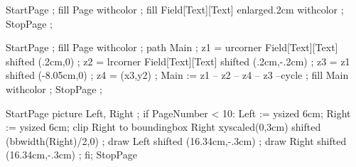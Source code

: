 \setuplayout [width=fit,
              margin=2cm,
              height=fit,
	      leftmargindistance=.8cm,
	      rightmargindistance=0cm,
              header=18mm, 
              footer=0cm, 
              topspace=.8cm, 
              backspace=2cm,
              location=singlesided]








\beginOLDTEX
{} 


StartPage ;
fill Page withcolor  ;
fill Field[Text][Text] enlarged.2cm withcolor  ;
StopPage ;
\stopuniqueMPgraphic 

StartPage ;
fill Page withcolor  ;
path Main ;
z1 = urcorner Field[Text][Text] shifted (.2cm,0) ;
z2 = lrcorner Field[Text][Text] shifted (.2cm,-.2cm) ;
z3 = z1 shifted (-8.05cm,0) ;
z4 = (x3,y2) ;
Main := z1 -- z2 -- z4 -- z3 --cycle ;
fill Main withcolor  ;
StopPage ;
\stopuniqueMPgraphic

StartPage
picture Left, Right ;
if PageNumber < 10:
	Left := \sometxt{\framed[width=1cm,offset=0pt,align=middle,frame=off]{\color[outer]{\NumberFont \folio}}} ysized 6cm; 
	Right := \sometxt{\framed[width=1cm,offset=0pt,align=middle,frame=off]{\color[inner]{\NumberFont \folio}}} ysized 6cm; 
	clip Right to boundingbox Right xyscaled(0,3cm) shifted (bbwidth(Right)/2,0) ;
	draw Left shifted (16.34cm,-.3cm) ;
	draw Right shifted (16.34cm,-.3cm) ;
fi;
StopPage
\stopuseMPgraphic


